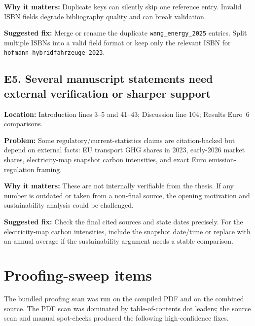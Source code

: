 \documentclass[11pt,a4paper]{article}
\newcommand{\loc}[1]{\textbf{Location:} #1\par}
\newcommand{\problem}{\textbf{Problem:} }
\newcommand{\why}{\textbf{Why it matters:} }
\newcommand{\fix}{\textbf{Suggested fix:} }
\begin{document}
\why Duplicate keys can silently skip one reference entry. Invalid ISBN fields degrade bibliography quality and can break validation.

\fix Merge or rename the duplicate \texttt{wang\_energy\_2025} entries. Split multiple ISBNs into a valid field format or keep only the relevant ISBN for \texttt{hofmann\_hybridfahrzeuge\_2023}.

\subsection*{E5. Several manuscript statements need external verification or sharper support}

\loc{Introduction lines 3--5 and 41--43; Discussion line 104; Results Euro~6 comparisons.}
\problem Some regulatory/current-statistics claims are citation-backed but depend on external facts: EU transport GHG shares in 2023, early-2026 market shares, electricity-map snapshot carbon intensities, and exact Euro emission-regulation framing.

\why These are not internally verifiable from the thesis. If any number is outdated or taken from a non-final source, the opening motivation and sustainability analysis could be challenged.

\fix Check the final cited sources and state dates precisely. For the electricity-map carbon intensities, include the snapshot date/time or replace with an annual average if the sustainability argument needs a stable comparison.

\section*{Proofing-sweep items}

The bundled proofing scan was run on the compiled PDF and on the combined source. The PDF scan was dominated by table-of-contents dot leaders; the source scan and manual spot-checks produced the following high-confidence fixes.
\end{document}

